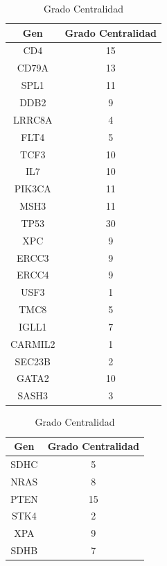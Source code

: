 	\begin{table}[h]
		\begin{minipage}{0.5\textwidth}
			\centering
			\begin{tabular}{|c|c|}
				\hline
				Gen & Grado Centralidad\\
				\hline
				CD4 & 15\\
				\hline
				CD79A & 13 \\
				\hline
				SPL1 & 11 \\
				\hline
				DDB2 & 9 \\
				\hline
				LRRC8A & 4 \\
				\hline
				FLT4 & 5 \\
				\hline
				TCF3 & 10 \\
				\hline
				IL7 & 10 \\
				\hline
				PIK3CA & 11 \\
				\hline
				MSH3 & 11 \\
				\hline
				TP53 & 30 \\
				\hline
				XPC & 9 \\
				\hline
				ERCC3 & 9 \\
				\hline
				ERCC4 & 9 \\
				\hline
				USF3 & 1 \\
				\hline
				TMC8 & 5 \\
				\hline
				IGLL1 & 7 \\
				\hline
				CARMIL2 & 1 \\
				\hline
				SEC23B & 2 \\
				\hline
				GATA2 & 10 \\
				\hline
				SASH3 & 3 \\
				\hline
			\end{tabular}
			\vspace{3pt}
			\caption{Grado Centralidad}
			\label{tab:gradoCentralidad}
		\end{minipage}%
		\begin{minipage}{0.5\textwidth}
			\centering
			\begin{tabular}{|c|c|}
				\hline
				Gen & Grado Centralidad \\
				\hline
				SDHC & 5\\
				\hline
				NRAS & 8 \\
				\hline
				PTEN & 15 \\
				\hline
				STK4 & 2 \\
				\hline
				XPA & 9 \\
				\hline
				SDHB & 7 \\

\end{tabular}
\end{minipage}
\end{table}
